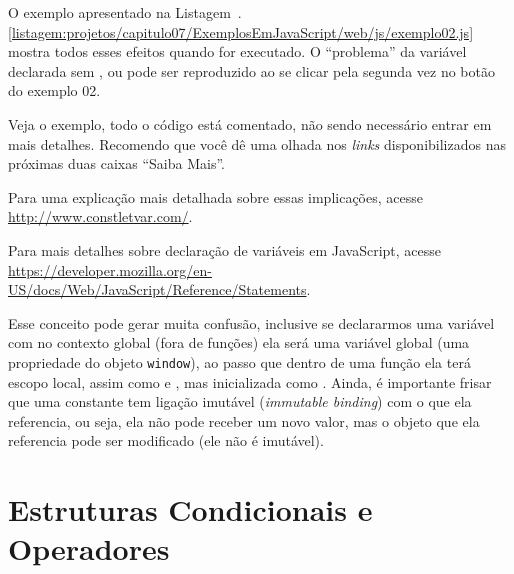 O exemplo apresentado na Listagem~\thechapter.\ref{listagem:projetos/capitulo07/ExemplosEmJavaScript/web/js/exemplo02.js} mostra todos esses efeitos quando for executado. O ``problema'' da variável declarada sem ,  ou  pode ser reproduzido ao se clicar pela segunda vez no botão do exemplo 02.


Veja o exemplo, todo o código está comentado, não sendo necessário entrar em mais detalhes. Recomendo que você dê uma olhada nos \textit{links} disponibilizados nas próximas duas caixas ``Saiba Mais''.

\begin{saibaMais}
    Para uma explicação mais detalhada sobre essas implicações, acesse \url{http://www.constletvar.com/}.
\end{saibaMais}

\begin{saibaMais}
    Para mais detalhes sobre declaração de variáveis em JavaScript, acesse \url{https://developer.mozilla.org/en-US/docs/Web/JavaScript/Reference/Statements}.
\end{saibaMais}

Esse conceito pode gerar muita confusão, inclusive se declararmos uma variável com  no contexto global (fora de funções) ela será uma variável global (uma propriedade do objeto \texttt{window}), ao passo que dentro de uma função ela terá escopo local, assim como  e , mas inicializada como . Ainda, é importante frisar que uma constante tem ligação imutável (\textit{immutable binding}) com o que ela referencia, ou seja, ela não pode receber um novo valor, mas o objeto que ela referencia pode ser modificado (ele não é imutável).



\section{Estruturas Condicionais e Operadores}

